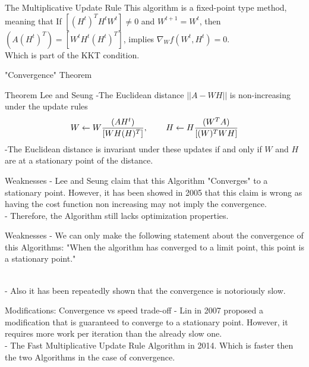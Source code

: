 \documentclass[aspectratio=169]{beamer}
\begin{document}
\begin{frame}{The Multiplicative Update Rule}
        This algorithm is a fixed-point type method, meaning that If $[(H^{t})^{T}H^{t}W^{t}] \neq 0$ and
        $W^{t+1} = W^{t}$, then $(A(H^{t})^{T}) = [W^{t}H^{t}(H^{t})^{T}]$, implies 
        $\nabla_{W}f(W^{t}, H^{t}) = 0$.\\
        Which is part of the KKT condition.
\end{frame}
\begin{frame}{"Convergence" Theorem}
    \begin{block}{Theorem Lee and Seung}
        -The Euclidean distance $||A - WH||$ is non-increasing under the update rules
        \begin{align*}
            W \gets W\frac{(AH^{t})}{[WH(H)^{T}]}, \hspace{0.3in}
            H \gets H\frac{(W^{T}A)}{[(W)^{T}WH]} 
        \end{align*}
        -The Euclidean distance is invariant under these updates if and only if $W$ and $H$ are at
        a stationary point of the distance.
    \end{block}
\end{frame}
\begin{frame}{Weaknesses}
    - Lee and Seung claim that this Algorithm "Converges" to a stationary point. However, it has been showed in 2005 that this claim is wrong as having  the cost function non increasing may not imply the convergence.\\
    \vspace{0.2in}
    - Therefore, the Algorithm still lacks optimization properties.\\
    \end{frame}
    \begin{frame}{Weaknesses}
    - We can only make the following statement about
    the convergence of this Algorithms: "When the algorithm has converged to a limit point, this point is a stationary point."\\\
    
    - Also it has been repeatedly shown that the convergence is notoriously slow.
    \end{frame}
    \begin{frame}{Modifications: Convergence vs speed trade-off}
    - Lin in 2007 proposed a modification that is guaranteed to converge to a stationary point. However, it  requires more work per iteration than the already slow one.\\
    \vspace{0.2in}
    - The Fast Multiplicative Update Rule Algorithm in 2014. Which is faster then the two Algorithms in the case of convergence.
\end{frame}
\end{document}

